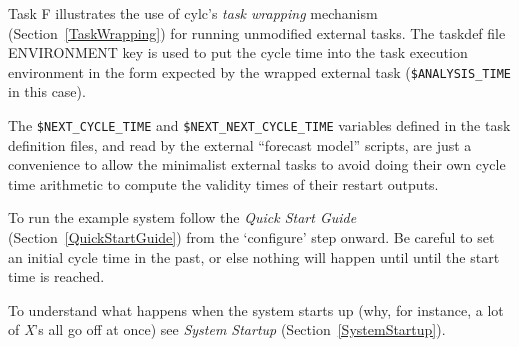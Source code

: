 Task F illustrates the use of cylc's {\em task wrapping} mechanism
(Section~\ref{TaskWrapping}) for running unmodified external tasks. 
The taskdef file ENVIRONMENT key is used to put the cycle time
into the task execution environment in the form expected by the wrapped
external task (\lstinline=$ANALYSIS_TIME= in this case). 

The \lstinline=$NEXT_CYCLE_TIME= and \lstinline=$NEXT_NEXT_CYCLE_TIME=
variables defined in the task definition files, and read by the external
``forecast model'' scripts, are just a convenience to allow the
minimalist external tasks to avoid doing their own cycle time arithmetic
to compute the validity times of their restart outputs.

To run the example system follow the {\em Quick Start Guide}
(Section~\ref{QuickStartGuide}) from the `configure' step onward. Be
careful to set an initial cycle time in the past, or else nothing will
happen until until the start time is reached.

To understand what happens when the system starts up (why, for instance,
a lot of {\em X}'s all go off at once) see {\em System Startup}
(Section~\ref{SystemStartup}).


